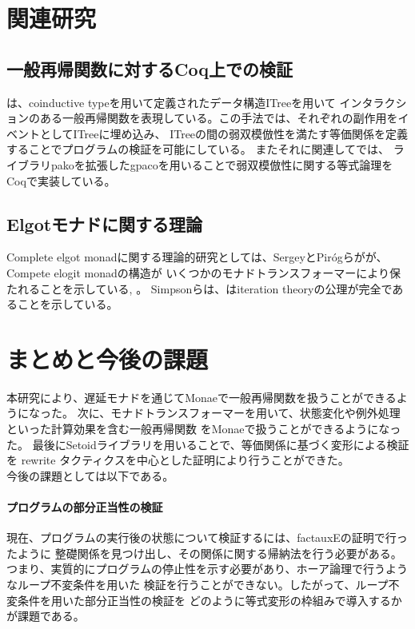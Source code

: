 \documentclass[japanese]{jssst_ppl}
\theoremstyle{definition}
\begin{document}
\section{関連研究}
\subsection{一般再帰関数に対するCoq上での検証}
\cite{10.1145/3371119}は、coinductive typeを用いて定義されたデータ構造ITreeを用いて
インタラクションのある一般再帰関数を表現している。この手法では、それぞれの副作用をイベントとしてITreeに埋め込み、
ITreeの間の弱双模倣性を満たす等価関係を定義することでプログラムの検証を可能にしている。
またそれに関連して\cite{10.1145/3372885.3373813}では、
ライブラリpakoを拡張したgpacoを用いることで弱双模倣性に関する等式論理をCoqで実装している。

\subsection{Elgotモナドに関する理論}
Complete elgot monadに関する理論的研究としては、SergeyとPirógらがが、Compete elogit monadの構造が
いくつかのモナドトランスフォーマーにより保たれることを示している\cite{GONCHAROV2015183}, \cite{PIROG2014273}。
Simpsonらは、はiteration theoryの公理が完全であることを示している\cite{cacmfpo}。

\section{まとめと今後の課題}
本研究により、遅延モナドを通じてMonaeで一般再帰関数を扱うことができるようになった。
次に、モナドトランスフォーマーを用いて、状態変化や例外処理といった計算効果を含む一般再帰関数
をMonaeで扱うことができるようになった。
最後にSetoidライブラリを用いることで、等価関係に基づく変形による検証を
rewrite タクティクスを中心とした証明により行うことができた。\\


今後の課題としては以下である。
\paragraph{プログラムの部分正当性の検証}
現在、プログラムの実行後の状態について検証するには、factauxEの証明で行ったように
整礎関係を見つけ出し、その関係に関する帰納法を行う必要がある。
つまり、実質的にプログラムの停止性を示す必要があり、ホーア論理で行うようなループ不変条件を用いた
検証を行うことができない。したがって、ループ不変条件を用いた部分正当性の検証を
どのように等式変形の枠組みで導入するかが課題である。
\end{document}
